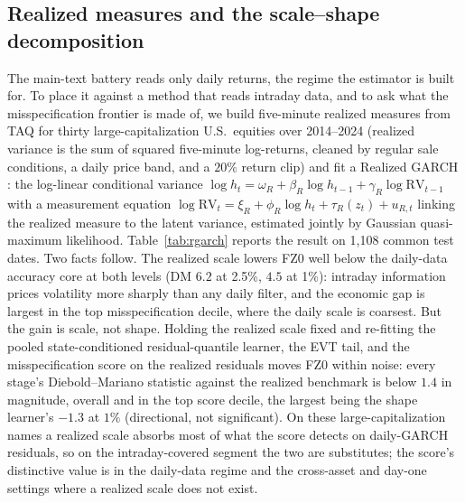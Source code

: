 \documentclass[11pt]{article}
\begin{document}
\subsection*{Realized measures and the scale--shape decomposition}\label{sec:rgarch-oa}
The main-text battery reads only daily returns, the regime the estimator is built
for. To place it against a method that reads intraday data, and to ask what the
misspecification frontier is made of, we build five-minute realized measures from
TAQ for thirty large-capitalization U.S.\ equities over 2014--2024 (realized
variance is the sum of squared five-minute log-returns, cleaned by regular sale
conditions, a daily price band, and a $20\%$ return clip) and fit a Realized GARCH
\citep{hansen2012realized}: the log-linear conditional variance
$\log h_t=\omega_R+\beta_R\log h_{t-1}+\gamma_R\log \mathrm{RV}_{t-1}$ with a measurement
equation $\log\mathrm{RV}_t=\xi_R+\phi_R\log h_t+\tau_R(z_t)+u_{R,t}$ linking the realized
measure to the latent variance, estimated jointly by Gaussian quasi-maximum
likelihood. Table~\ref{tab:rgarch} reports the result on 1{,}108 common test dates.
Two facts follow. The realized scale lowers FZ0 well below the daily-data accuracy
core at both levels (DM $6.2$ at 2.5\%, $4.5$ at 1\%): intraday information prices
volatility more sharply than any daily filter, and the economic gap is largest in
the top misspecification decile, where the daily scale is coarsest. But the gain is
scale, not shape. Holding the realized scale fixed and re-fitting the pooled
state-conditioned residual-quantile learner, the EVT tail, and the misspecification
score on the realized residuals moves FZ0 within noise: every stage's
Diebold--Mariano statistic against the realized benchmark is below $1.4$ in
magnitude, overall and in the top score decile, the largest being the shape learner's
$-1.3$ at $1\%$ (directional, not significant). On these large-capitalization names a
realized scale absorbs most of what the score detects on daily-GARCH residuals, so on
the intraday-covered segment the two are substitutes; the score's distinctive value is
in the daily-data regime and the cross-asset and day-one settings where a realized
scale does not exist.
\end{document}
